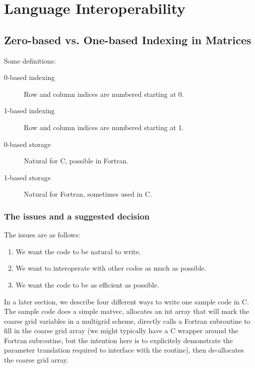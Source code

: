 \chapter{Language Interoperability}
\label{Language Interoperability}

\section{Zero-based vs. One-based Indexing in Matrices}
\label{Zero-based vs. One-based Indexing in Matrices}

Some definitions:
\begin{description}
\item[0-based indexing] Row and column indices are numbered starting at 0.
\item[1-based indexing] Row and column indices are numbered starting at 1.
\item[0-based storage]  Natural for C, possible in Fortran.
\item[1-based storage]  Natural for Fortran, sometimes used in C.
\end{description}

\subsection{The issues and a suggested decision}
\label{The issues and a suggested decision}

The issues are as follows:
\begin{enumerate}
  \item We want the code to be natural to write.
  \item We want to interoperate with other codes as much as possible.
  \item We want the code to be as efficient as possible.
\end{enumerate}

In a later section, we describe four different ways to write one
sample code in C.  The sample code does a simple matvec, allocates an
int array that will mark the coarse grid variables in a multigrid
scheme, directly calls a Fortran subroutine to fill in the coarse grid
array (we might typically have a C wrapper around the Fortran
subroutine, but the intention here is to explicitely demonstrate the
parameter translation required to interface with the routine), then
de-allocates the coarse grid array.

